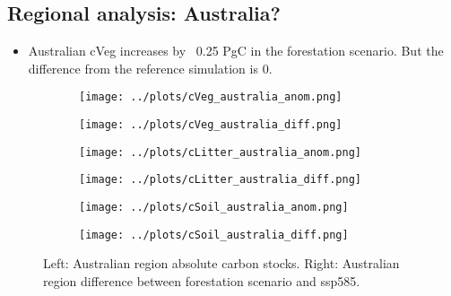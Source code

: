 \documentclass[]{article}
\begin{document}
\subsection{Regional analysis: Australia?}

\begin{itemize}
    \item Australian cVeg increases by ~0.25 PgC in the forestation scenario. But the difference from the reference simulation is 0.
\end{itemize}

\begin{figure}[H]
    \centering
    \begin{subfigure}[b]{0.4\linewidth}
        \texttt{[image: ../plots/cVeg\_australia\_anom.png]}
    \end{subfigure}
    \begin{subfigure}[b]{0.4\linewidth}
        \texttt{[image: ../plots/cVeg\_australia\_diff.png]}
    \end{subfigure}
    \begin{subfigure}[b]{0.4\linewidth}
        \texttt{[image: ../plots/cLitter\_australia\_anom.png]}
    \end{subfigure}
    \begin{subfigure}[b]{0.4\linewidth}
        \texttt{[image: ../plots/cLitter\_australia\_diff.png]}
    \end{subfigure}
    \begin{subfigure}[b]{0.4\linewidth}
        \texttt{[image: ../plots/cSoil\_australia\_anom.png]}
    \end{subfigure}
    \begin{subfigure}[b]{0.4\linewidth}
        \texttt{[image: ../plots/cSoil\_australia\_diff.png]}
    \end{subfigure}
    \caption{Left: Australian region absolute carbon stocks. Right: Australian region  difference between forestation scenario and ssp585.}
    \label{fig:aus_region}
\end{figure}
\end{document}
